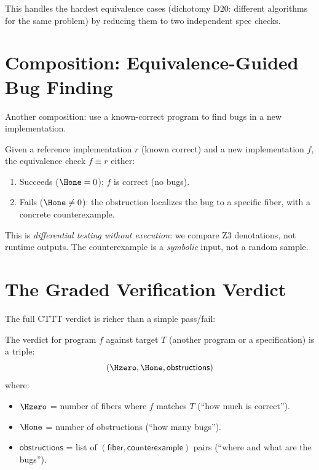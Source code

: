 This handles the hardest equivalence cases (dichotomy D20: different
algorithms for the same problem) by reducing them to two independent
spec checks.

\section{Composition: Equivalence-Guided Bug Finding}

Another composition: use a known-correct program to find bugs in
a new implementation.

\begin{theorem}
Given a reference implementation $r$ (known correct) and a new
implementation $f$, the equivalence check $f \equiv r$ either:
\begin{enumerate}
  \item Succeeds ($\Hone = 0$): $f$ is correct (no bugs).
  \item Fails ($\Hone \neq 0$): the obstruction localizes the bug
    to a specific fiber, with a concrete counterexample.
\end{enumerate}
\end{theorem}

This is \emph{differential testing without execution}: we compare
Z3 denotations, not runtime outputs.  The counterexample is a
\emph{symbolic} input, not a random sample.

\section{The Graded Verification Verdict}

The full CTTT verdict is richer than a simple pass/fail:

\begin{definition}
The verdict for program $f$ against target $T$ (another program or
a specification) is a triple:
\[
  (\Hzero, \Hone, \mathsf{obstructions})
\]
where:
\begin{itemize}
  \item $\Hzero$ = number of fibers where $f$ matches $T$
    (``how much is correct'').
  \item $\Hone$ = number of obstructions (``how many bugs'').
  \item $\mathsf{obstructions}$ = list of
    $(\mathsf{fiber}, \mathsf{counterexample})$ pairs
    (``where and what are the bugs'').
\end{itemize}
\end{definition}

